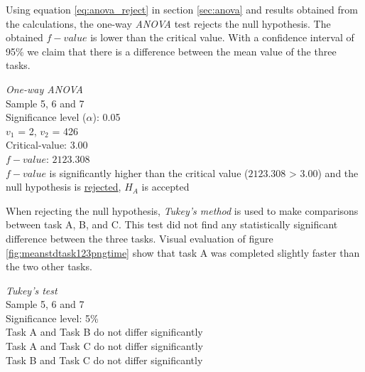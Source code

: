 Using equation \ref{eq:anova_reject} in section \ref{sec:anova} and results obtained from the calculations, the one-way \textit{ANOVA} test rejects the null hypothesis. The obtained $f-value$ is lower than the critical value. With a confidence interval of 95\% we claim that there is a difference between the mean value of the three tasks.
\vspace{0.2cm}
 \begin{center}
	\begin{tcolorbox}[width=0.8\textwidth]
		\centering
		\textit{One-way \textit{ANOVA}}\\
		Sample 5, 6 and 7\\[0.5cm]
		
		Significance level ($\alpha$): 0.05 \\
		$v_1$ = 2, $v_2$ = 426 \\
		Critical-value: 3.00 \\%
		$f-value$: $2123.308$ \\[0.2cm] 
		
		$f-value$ is significantly higher than the critical value ($2123.308$ > $3.00$) and the null hypothesis is \underline{rejected}, $H_A$ is accepted\\[0.5cm]
	\end{tcolorbox} 
\end{center}
\vspace{0.2cm}
When rejecting the null hypothesis, \textit{Tukey's method} is used to make comparisons between task A, B, and C. This test did not find any statistically significant difference between the three tasks. Visual evaluation of figure \ref{fig:meanstdtask123pngtime} show that task A was completed slightly faster than the two other tasks. 
\vspace{0.2cm}
 \begin{center}
	\begin{tcolorbox}[width=0.8\textwidth]
		\centering
		\textit{Tukey's test}\\
		Sample 5, 6 and 7\\
		Significance level: 5\%  \\[0.5cm] 
		
		Task A and Task B do not differ significantly \\
		Task A and Task C do not differ significantly \\
		Task B and Task C do not differ significantly \\[0.2cm]
	\end{tcolorbox} 
\end{center}

